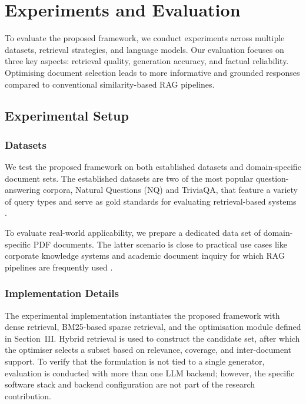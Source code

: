 \documentclass[conference]{IEEEtran}
\begin{document}
\section{Experiments and Evaluation}

To evaluate the proposed framework, we conduct experiments across multiple datasets, retrieval strategies, and language models. Our evaluation focuses on three key aspects: retrieval quality, generation accuracy, and factual reliability. Optimising document selection leads to more informative and grounded responses compared to conventional similarity-based RAG pipelines.

\subsection{Experimental Setup}

\subsubsection{Datasets}

We test the proposed framework on both established datasets and domain-specific document sets. The established datasets are two of the most popular question-answering corpora, Natural Questions (NQ) and TriviaQA, that feature a variety of query types and serve as gold standards for evaluating retrieval-based systems \cite{3}.

To evaluate real-world applicability, we prepare a dedicated data set of domain-specific PDF documents. The latter scenario is close to practical use cases like corporate knowledge systems and academic document inquiry for which RAG pipelines are frequently used \cite{5,9}.

\subsubsection{Implementation Details}

The experimental implementation instantiates the proposed framework with dense retrieval, BM25-based sparse retrieval, and the optimisation module defined in Section~III. Hybrid retrieval is used to construct the candidate set, after which the optimiser selects a subset based on relevance, coverage, and inter-document support. To verify that the formulation is not tied to a single generator, evaluation is conducted with more than one LLM backend; however, the specific software stack and backend configuration are not part of the research contribution.
\end{document}
